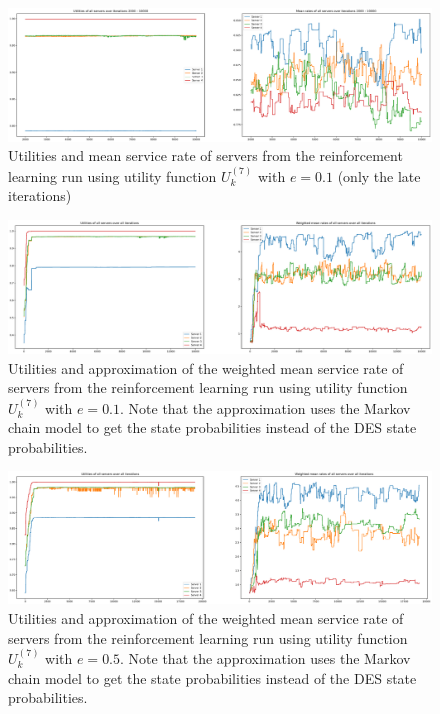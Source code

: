 \begin{figure}[H]
    \includegraphics[width=\textwidth]{chapters/00_appendix/03_more_rl_results/Bin/utility_7_eps/u7_2_e01_late_iter.eps}
    \caption{Utilities and mean service rate of servers from the reinforcement
    learning run using utility function \(U_k^{(7)}\) with \(e = 0.1\) (only
    the late iterations)}
    \label{fig:RL_utility7_2_e01_late_iter}
\end{figure}

\begin{figure}[H]
    \includegraphics[width=\textwidth]{chapters/00_appendix/03_more_rl_results/Bin/utility_7_eps/u7_3_e01_markov.eps}
    \caption{Utilities and approximation of the weighted mean service rate of
    servers from the reinforcement learning run using utility function
    \(U_k^{(7)}\) with \(e = 0.1\). Note that the approximation uses the Markov
    chain model to get the state probabilities instead of the DES state
    probabilities.}
    \label{fig:RL_utility7_3_e01_markov}
\end{figure}

\begin{figure}[H]
    \includegraphics[width=\textwidth]{chapters/00_appendix/03_more_rl_results/Bin/utility_7_eps/u7_3_e05_markov.eps}
    \caption{Utilities and approximation of the weighted mean service rate of
    servers from the reinforcement learning run using utility function
    \(U_k^{(7)}\) with \(e = 0.5\). Note that the approximation uses the Markov
    chain model to get the state probabilities instead of the DES state
    probabilities.}
    \label{fig:RL_utility7_3_e05_markov}
\end{figure}

